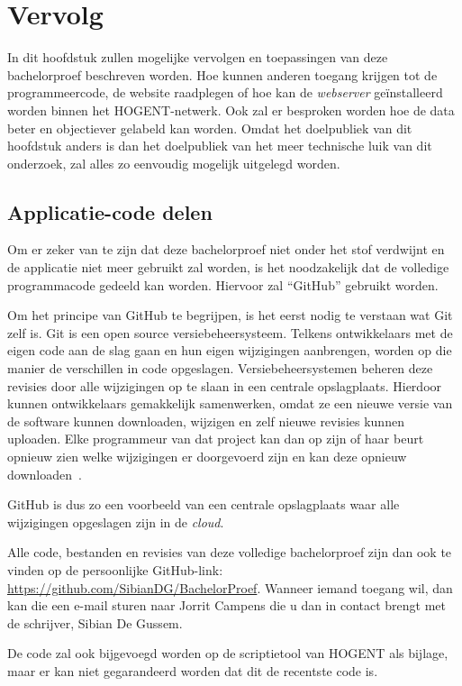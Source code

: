 \chapter{Vervolg}
\label{ch:vervolg}

In dit hoofdstuk zullen mogelijke vervolgen en toepassingen van deze bachelorproef beschreven worden. Hoe kunnen anderen toegang krijgen tot de programmeercode, de website raadplegen of hoe kan de \textit{webserver} geïnstalleerd worden binnen het HOGENT-netwerk. Ook zal er besproken worden hoe de data beter en objectiever gelabeld kan worden. Omdat het doelpubliek van dit hoofdstuk anders is dan het doelpubliek van het meer technische luik van dit onderzoek, zal alles zo eenvoudig mogelijk uitgelegd worden.

\section{Applicatie-code delen}
Om er zeker van te zijn dat deze bachelorproef niet onder het stof verdwijnt en de applicatie niet meer gebruikt zal worden, is het noodzakelijk dat de volledige programmacode gedeeld kan worden. Hiervoor zal ``GitHub'' gebruikt worden.

Om het principe van GitHub te begrijpen, is het eerst nodig te verstaan wat Git zelf is. Git is een open source versiebeheersysteem. Telkens ontwikkelaars met de eigen code aan de slag gaan en hun eigen wijzigingen aanbrengen, worden op die manier de verschillen in code opgeslagen. Versiebeheersystemen beheren deze revisies door alle wijzigingen op te slaan in een centrale opslagplaats. Hierdoor kunnen ontwikkelaars gemakkelijk samenwerken, omdat ze een nieuwe versie van de software kunnen downloaden, wijzigen en zelf nieuwe revisies kunnen uploaden. Elke programmeur van dat project kan dan op zijn of haar beurt opnieuw zien welke wijzigingen er doorgevoerd zijn en kan deze opnieuw downloaden~\autocite{Brown2019}.

GitHub is dus zo een voorbeeld van een centrale opslagplaats waar alle wijzigingen opgeslagen zijn in de \textit{cloud}.

Alle code, bestanden en revisies van deze volledige bachelorproef zijn dan ook te vinden op de persoonlijke GitHub-link: \url{https://github.com/SibianDG/BachelorProef}. Wanneer iemand toegang wil, dan kan die een e-mail sturen naar Jorrit Campens die u dan in contact brengt met de schrijver, Sibian De Gussem.

De code zal ook bijgevoegd worden op de scriptietool van HOGENT als bijlage, maar er kan niet gegarandeerd worden dat dit de recentste code is.

